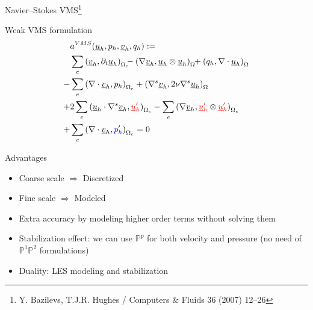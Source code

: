 \documentclass[9pt,compress,t,aspectratio=169]{beamer}
\newcommand{\scpr}[2]{\left(#1,#2\right)_\Omega}
\newcommand{\scpre}[2]{\sum_e\left(#1,#2\right)_{\Omega_e}}
\newcommand{\red}[1]{\textcolor{red}{#1}}
\newcommand{\blue}[1]{\textcolor{blue}{#1}}
\newcommand{\ww}[1]{\underline{#1}}
\newcommand{\1}{\begin{pmatrix}
		1\\
		1
\end{pmatrix}}
\renewcommand{\vec}[1]{\ww{#1}}
\begin{document}
\begin{frame}{Navier--Stokes VMS\footnote{Y. Bazilevs, T.J.R. Hughes / Computers \& Fluids 36 (2007) 12--26}}
	\begin{minipage}{0.49\textwidth}
		\begin{block}{Weak VMS formulation}
			\begin{align*}
				&a^{VMS}(\vec{u}_h,p_h,\vec{v}_h,q_h):=\\
				&\scpre{\vec{v}_h}{\partial_t \vec{u}_h} \!\!\!-\scpr{\nabla \vec{v}_h}{\vec{u}_h\otimes \vec{u}_h} \!\!+ \scpr{q_h}{\nabla \cdot \vec{u}_h} \\
				-& \scpre{\nabla \cdot \vec{v}_h}{p_h} + \scpr{\nabla^s \vec{v}_h}{2\nu \nabla^s \vec{u}_h} \\
				+&2\scpre{\vec{u}_h \cdot \nabla^s \vec{v}_h}{\red{\vec{u}'_h}}				-\scpre{\nabla \vec{v}_h}{\red{\vec{u}'_h}\otimes \red{\vec{u}'_h}}\\
				+&\scpre{\nabla \cdot \vec{v}_h}{\blue{p'_h}}=0
			\end{align*}
		\end{block}
\end{minipage}\hfill
	\begin{minipage}{0.49\textwidth}
	\begin{block}{Advantages}
		\begin{itemize}
			\item Coarse scale $\Longrightarrow$ Discretized
			\item Fine scale $\Longrightarrow$ Modeled
			\item Extra accuracy by modeling higher order terms without solving them
			\item Stabilization effect: we can use $\mathbb P^p$ for both velocity and pressure (no need of $\mathbb P^1\mathbb P^2$ formulations)
			\item Duality: LES modeling and stabilization
		\end{itemize}
	\end{block}
\end{minipage}
\end{frame}
\end{document}
